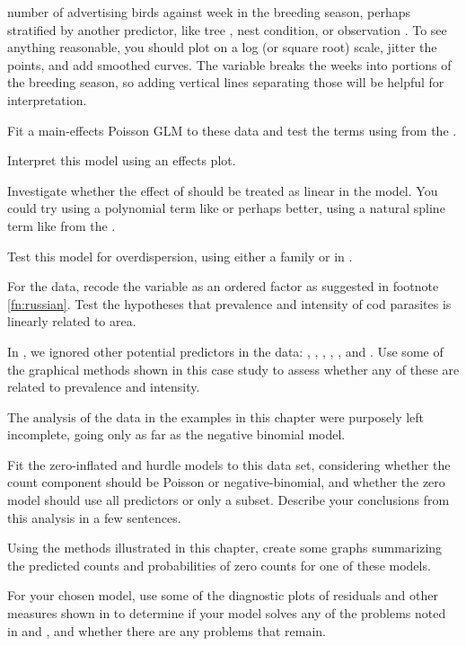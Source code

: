 \documentclass[11pt]{book}\usepackage[]{graphicx}\usepackage[]{color}
\begin{document}
\begin{Exercises}
\begin{enumerate*}
		number of advertising birds against week in the breeding season, perhaps stratified
		by another predictor, like tree , nest condition, or observation
		. 
		To see anything reasonable,
		you should plot  on a log (or square root) scale, jitter the points, and add
		smoothed curves. The variable  breaks the weeks into portions of the
		breeding season, so adding vertical lines separating those will be helpful for interpretation.
		\item Fit a main-effects Poisson GLM to these data and test the terms using
		 from the .
		\item Interpret this model using an effects plot.
		\item Investigate whether the effect of  should be treated as linear in the
		model.  You could try using a polynomial term like  or
		perhaps better, using a natural spline term like  from the .
    \item Test this model for overdispersion, using either a  family or
     in .
	\end{enumerate*}		

  \exercise For the  data, recode the  variable as an ordered factor as suggested in
  footnote \ref{fn:russian}.  Test the hypotheses that prevalence and intensity of cod parasites is linearly
  related to area.

  \exercise In , we ignored other potential predictors in the  data:
  , , , , , and .
  Use some of the graphical methods shown in this case study to assess whether any of these are related
  to prevalence and intensity.

  \exercise The analysis of the  data in the examples in this chapter were purposely left incomplete,
  going only as far as the negative binomial model.
  \begin{enumerate*}
    \item Fit the zero-inflated and hurdle models to this data set, considering whether the count component should
    be Poisson or negative-binomial, and whether the zero model should use all predictors or only a subset.
    Describe your conclusions from this analysis in a few sentences.
    \item Using the methods illustrated in this chapter, create some graphs summarizing the predicted counts
    and probabilities of zero counts for one of these models.
    \item For your chosen model, use some of the diagnostic plots of residuals and other measures shown in
     to determine if your model solves any of the problems noted in 
    and , and whether there are any problems that remain.
  \end{enumerate*}


\end{Exercises}
\end{document}
